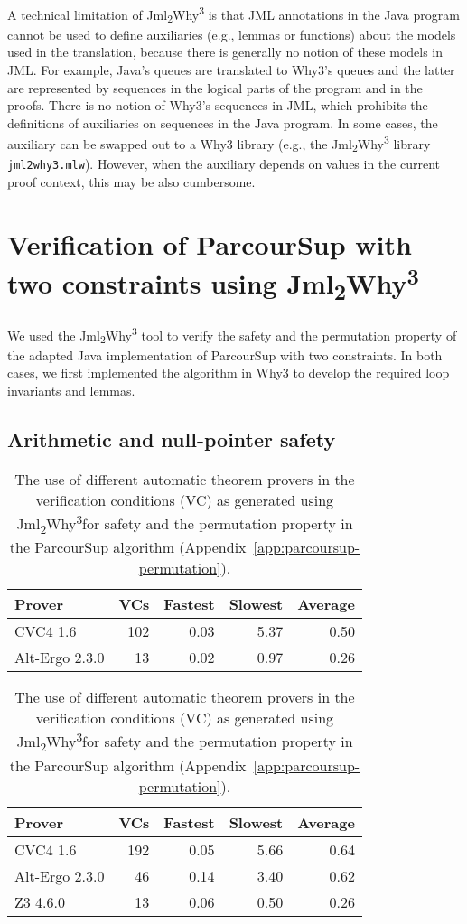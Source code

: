 \documentclass[a4paper]{report}
\newcommand{\aref}[1]{Appendix~\ref{#1}}
\newcommand{\jmlwhy}{\texorpdfstring{Jml\textsubscript{2}Why\textsuperscript{3}}{Jml2Why3}}
\begin{document}
A technical limitation of \jmlwhy{} is that JML annotations in the Java program
cannot be used to define auxiliaries (e.g., lemmas or functions) about the
models used in the translation, because there is generally no notion of these
models in JML. For example, Java's queues are translated to Why3's queues and
the latter are represented by sequences in the logical parts of the program and
in the proofs. There is no notion of Why3's sequences in JML, which prohibits
the definitions of auxiliaries on sequences in the Java program. In some cases,
the auxiliary can be swapped out to a Why3 library (e.g., the \jmlwhy{} library
\texttt{jml2why3.mlw}). However, when the auxiliary depends on values in the
current proof context, this may be also cumbersome.

\section{Verification of ParcourSup with two constraints using \jmlwhy}

We used the \jmlwhy{} tool to verify the safety and the permutation property of
the adapted Java implementation of ParcourSup with two constraints. In both
cases, we first implemented the algorithm in Why3 to develop the required loop
invariants and lemmas.

\subsection{Arithmetic and null-pointer safety}
\label{sec:verification-safety}

\begin{table}[tb]
  \caption{The use of automatic theorem provers in the verification conditions
    (VC) as generated using \jmlwhy for the arithmetic and null-pointer safety
    of the ParcourSup algorithm (\aref{app:parcoursup-adapted}).}
  \label{tab:verification-safety-why3}
  \centering
  \begin{tabular}{lrrrr}
    \toprule
    Prover         & VCs & Fastest & Slowest & Average \\
    \midrule
    CVC4 1.6       & 102 & 0.03    & 5.37    & 0.50 \\
    Alt-Ergo 2.3.0 &  13 & 0.02    & 0.97    & 0.26 \\
    \bottomrule
  \end{tabular}
  \caption{The use of different automatic theorem provers in the verification
    conditions (VC) as generated using \jmlwhy for safety and the permutation
    property in the ParcourSup algorithm (\aref{app:parcoursup-permutation}).}
  \label{tab:verification-permutation-why3}
  \centering
  \begin{tabular}{lrrrr}
    \toprule
    Prover         & VCs & Fastest & Slowest & Average \\
    \midrule
    CVC4 1.6       & 192 & 0.05    & 5.66    & 0.64 \\
    Alt-Ergo 2.3.0 &  46 & 0.14    & 3.40    & 0.62 \\
    Z3 4.6.0       &  13 & 0.06    & 0.50    & 0.26 \\
    \bottomrule
  \end{tabular}
\end{table}
\end{document}
